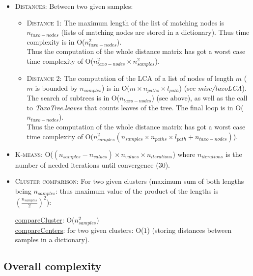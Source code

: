 \documentclass{report}
\begin{document}
\begin{itemize}
\item \textsc{Distances:} Between two given samples:\\

\begin{itemize}
\item \textsc{Distance 1:} The maximum length of the list of matching nodes is $n_{taxo-nodes}$ (lists of matching nodes are stored in a dictionary). Thus time complexity is in O($n_{taxo-nodes}^{2}$).\\

Thus the computation of the whole distance matrix has got a worst case time complexity of O($n_{taxo-nodes}^{2} \times n_{samples}^{2}$).

\item \textsc{Distance 2:} The computation of the \textsc{LCA} of a list of nodes of length $m$ ($m$ is bounded by $n_{samples}$) is in O($m \times n_{paths} \times l_{path}$) (see \emph{misc/taxoLCA}). The search of subtrees is in O($n_{taxo-nodes}$) (see above), as well as the call to \emph{TaxoTree.leaves} that counts leaves of the tree. The final loop is in O($n_{taxo-nodes}$).\\

Thus the computation of the whole distance matrix has got a worst case time complexity of O($n_{samples}^{2} (n_{samples} \times n_{paths} \times l_{path} + n_{taxo-nodes})$).

\end{itemize}

\item \textsc{K-means:} O($(n_{samples} - n_{values}) \times n_{values} \times n_{iterations}$) where $n_{iterations}$ is the number of needed iterations until convergence (30).

\item \textsc{Cluster comparison:} For two given clusters (maximum sum of both lengths being $n_{samples}$: thus maximum value of the product of the lengths is $(\frac{n_{samples}}{2})^{2}$):

\uline{compareCluster}: O($n_{samples}^{2}$)\\

\uline{compareCenters}: for two given clusters: O($1$) (storing distances between samples in a dictionary).\\

\end{itemize}

\subsection{Overall complexity}
\end{document}
